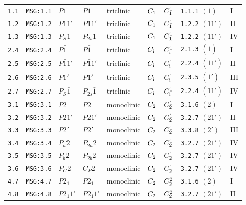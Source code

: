 \documentclass[fleqn,10pt]{jsarticle}
\begin{document}
\begin{center}
\begin{longtable}{lllllllll}
\texttt{1.1} & \texttt{MSG:1.1} & $P1$ & $P1$ & triclinic & $C_{\rm 1}$ & $C_{\rm 1}^{1}$ & \texttt{1.1.1} $(1)$ & I \\
\texttt{1.2} & \texttt{MSG:1.2} & $P11'$ & $P11'$ & triclinic & $C_{\rm 1}$ & $C_{\rm 1}^{1}$ & \texttt{1.2.2} $(11')$ & II \\
\texttt{1.3} & \texttt{MSG:1.3} & $P_{S}1$ & $P_{2s}1$ & triclinic & $C_{\rm 1}$ & $C_{\rm 1}^{1}$ & \texttt{1.2.2} $(11')$ & IV \\ \hline
\texttt{2.4} & \texttt{MSG:2.4} & $P\bar{1}$ & $P\bar{1}$ & triclinic & $C_{\rm i}$ & $C_{\rm i}^{1}$ & \texttt{2.1.3} $(\bar{1})$ & I \\
\texttt{2.5} & \texttt{MSG:2.5} & $P\bar{1}1'$ & $P\bar{1}1'$ & triclinic & $C_{\rm i}$ & $C_{\rm i}^{1}$ & \texttt{2.2.4} $(\bar{1}1')$ & II \\
\texttt{2.6} & \texttt{MSG:2.6} & $P\bar{1}'$ & $P\bar{1}'$ & triclinic & $C_{\rm i}$ & $C_{\rm i}^{1}$ & \texttt{2.3.5} $(\bar{1}')$ & III \\
\texttt{2.7} & \texttt{MSG:2.7} & $P_{S}\bar{1}$ & $P_{2s}\bar{1}$ & triclinic & $C_{\rm i}$ & $C_{\rm i}^{1}$ & \texttt{2.2.4} $(\bar{1}1')$ & IV \\ \hline
\texttt{3.1} & \texttt{MSG:3.1} & $P2$ & $P2$ & monoclinic & $C_{\rm 2}$ & $C_{\rm 2}^{1}$ & \texttt{3.1.6} $(2)$ & I \\
\texttt{3.2} & \texttt{MSG:3.2} & $P21'$ & $P21'$ & monoclinic & $C_{\rm 2}$ & $C_{\rm 2}^{1}$ & \texttt{3.2.7} $(21')$ & II \\
\texttt{3.3} & \texttt{MSG:3.3} & $P2'$ & $P2'$ & monoclinic & $C_{\rm 2}$ & $C_{\rm 2}^{1}$ & \texttt{3.3.8} $(2')$ & III \\
\texttt{3.4} & \texttt{MSG:3.4} & $P_{a}2$ & $P_{2a}2$ & monoclinic & $C_{\rm 2}$ & $C_{\rm 2}^{1}$ & \texttt{3.2.7} $(21')$ & IV \\
\texttt{3.5} & \texttt{MSG:3.5} & $P_{b}2$ & $P_{2b}2$ & monoclinic & $C_{\rm 2}$ & $C_{\rm 2}^{1}$ & \texttt{3.2.7} $(21')$ & IV \\
\texttt{3.6} & \texttt{MSG:3.6} & $P_{C}2$ & $C_{P}2$ & monoclinic & $C_{\rm 2}$ & $C_{\rm 2}^{1}$ & \texttt{3.2.7} $(21')$ & IV \\ \hline
\texttt{4.7} & \texttt{MSG:4.7} & $P2_{1}$ & $P2_{1}$ & monoclinic & $C_{\rm 2}$ & $C_{\rm 2}^{2}$ & \texttt{3.1.6} $(2)$ & I \\
\texttt{4.8} & \texttt{MSG:4.8} & $P2_{1}1'$ & $P2_{1}1'$ & monoclinic & $C_{\rm 2}$ & $C_{\rm 2}^{2}$ & \texttt{3.2.7} $(21')$ & II \\

\end{longtable}
\end{center}
\end{document}
